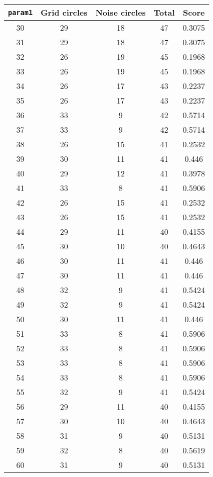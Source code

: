 \documentclass[letterpaper, 12pt]{article}
\begin{document}
\begin{longtable}{|c|c|c|c|c|}
\hline
\textbf{\texttt{param1}} & \textbf{Grid circles} & \textbf{Noise circles} & \textbf{Total} & \textbf{Score} \\
\hline
30 & 29 & 18 & 47 & 0.3075 \\
\hline
31 & 29 & 18 & 47 & 0.3075 \\
\hline
32 & 26 & 19 & 45 & 0.1968 \\
\hline
33 & 26 & 19 & 45 & 0.1968 \\
\hline
34 & 26 & 17 & 43 & 0.2237 \\
\hline
35 & 26 & 17 & 43 & 0.2237 \\
\hline
36 & 33 & 9 & 42 & 0.5714 \\
\hline
37 & 33 & 9 & 42 & 0.5714 \\
\hline
38 & 26 & 15 & 41 & 0.2532 \\
\hline
39 & 30 & 11 & 41 & 0.446 \\
\hline
40 & 29 & 12 & 41 & 0.3978 \\
\hline
41 & 33 & 8 & 41 & 0.5906 \\
\hline
42 & 26 & 15 & 41 & 0.2532 \\
\hline
43 & 26 & 15 & 41 & 0.2532 \\
\hline
44 & 29 & 11 & 40 & 0.4155 \\
\hline
45 & 30 & 10 & 40 & 0.4643 \\
\hline
46 & 30 & 11 & 41 & 0.446 \\
\hline
47 & 30 & 11 & 41 & 0.446 \\
\hline
48 & 32 & 9 & 41 & 0.5424 \\
\hline
49 & 32 & 9 & 41 & 0.5424 \\
\hline
50 & 30 & 11 & 41 & 0.446 \\
\hline
51 & 33 & 8 & 41 & 0.5906 \\
\hline
52 & 33 & 8 & 41 & 0.5906 \\
\hline
53 & 33 & 8 & 41 & 0.5906 \\
\hline
54 & 33 & 8 & 41 & 0.5906 \\
\hline
55 & 32 & 9 & 41 & 0.5424 \\
\hline
56 & 29 & 11 & 40 & 0.4155 \\
\hline
57 & 30 & 10 & 40 & 0.4643 \\
\hline
58 & 31 & 9 & 40 & 0.5131 \\
\hline
59 & 32 & 8 & 40 & 0.5619 \\
\hline
60 & 31 & 9 & 40 & 0.5131 \\
\hline

\end{longtable}
\end{document}
